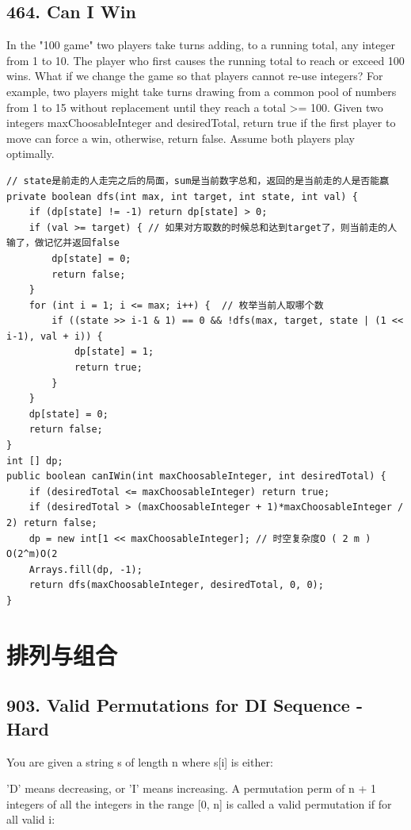 \documentclass[9pt, b5paaper]{book}
\begin{document}
\section{464. Can I Win}
\label{sec-15-5}
In the "100 game" two players take turns adding, to a running total, any integer from 1 to 10. The player who first causes the running total to reach or exceed 100 wins.
What if we change the game so that players cannot re-use integers?
For example, two players might take turns drawing from a common pool of numbers from 1 to 15 without replacement until they reach a total >= 100.
Given two integers maxChoosableInteger and desiredTotal, return true if the first player to move can force a win, otherwise, return false. Assume both players play optimally.
\begin{verbatim}
// state是前走的人走完之后的局面，sum是当前数字总和，返回的是当前走的人是否能赢
private boolean dfs(int max, int target, int state, int val) {
    if (dp[state] != -1) return dp[state] > 0;
    if (val >= target) { // 如果对方取数的时候总和达到target了，则当前走的人输了，做记忆并返回false
        dp[state] = 0;
        return false;
    }
    for (int i = 1; i <= max; i++) {  // 枚举当前人取哪个数
        if ((state >> i-1 & 1) == 0 && !dfs(max, target, state | (1 << i-1), val + i)) {
            dp[state] = 1;
            return true;
        }
    }
    dp[state] = 0;
    return false;
}
int [] dp;
public boolean canIWin(int maxChoosableInteger, int desiredTotal) {
    if (desiredTotal <= maxChoosableInteger) return true;
    if (desiredTotal > (maxChoosableInteger + 1)*maxChoosableInteger / 2) return false;
    dp = new int[1 << maxChoosableInteger]; // 时空复杂度O ( 2 m ) O(2^m)O(2 
    Arrays.fill(dp, -1);
    return dfs(maxChoosableInteger, desiredTotal, 0, 0);
}
\end{verbatim}


\chapter{排列与组合}
\label{sec-16}
\section{903. Valid Permutations for DI Sequence - Hard}
\label{sec-16-1}
You are given a string s of length n where s[i] is either:

'D' means decreasing, or
'I' means increasing.
A permutation perm of n + 1 integers of all the integers in the range [0, n] is called a valid permutation if for all valid i:
\end{document}

